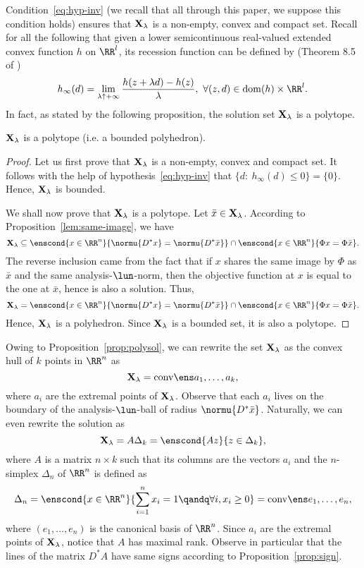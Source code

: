 Condition~\cref{eq:hyp-inv} (we recall that all through this paper, we suppose this condition holds) ensures that $\mathbf{X}_{\lambda}$ is a non-empty, convex and compact set.
 Recall for all the following that given a lower semicontinuous real-valued extended convex function $h$ on $\RR^l$, its recession function can be defined by (Theorem 8.5 of \cite{rockafellar})
$$h_\infty(d)=\lim\limits_{\lambda\uparrow+\infty}\displaystyle{h(z+\lambda d)-h(z)\over\lambda},\ \forall (z,d)\in \dom(h)\times\RR^{l}.$$
In fact, as stated by the following proposition, the solution set $\mathbf{X}_{\lambda}$ is a polytope.
\begin{proposition}\label{prop:polysol}
  $\mathbf{X}_{\lambda}$ is a polytope (i.e. a bounded polyhedron).
\end{proposition}
\begin{proof}
  Let us first prove that $\mathbf{X}_{\lambda}$ is a non-empty, convex and compact set. 
It follows with the help of hypothesis~\eqref{eq:hyp-inv} that $\{d:\ h_\infty(d)\leq0\}=\{0\}$.
  Hence, $\mathbf{X}_{\lambda}$ is bounded.

  We shall now prove that $\mathbf{X}_{\lambda}$ is a polytope.
  Let $\bar{x} \in \mathbf{X}_{\lambda}$.
  According to Proposition~\ref{lem:same-image}, we have
  \begin{equation*}
    \Xl \subseteq
    \enscond{x \in \RR^n}{\normu{D^* x} = \normu{D^* \bar{x}}} \cap
    \enscond{x \in \RR^n}{\Phi x = \Phi \bar{x}} .
  \end{equation*}
  The reverse inclusion came from the fact that if $x$ shares the same image by $\Phi$ as $\bar{x}$ and the same analysis-$\lun$-norm, then the objective function at $x$ is equal to the one at $\bar{x}$, hence is also a solution.
  Thus,
  \begin{equation*}
    \Xl =
    \enscond{x \in \RR^n}{\normu{D^* x} = \normu{D^* \bar{x}}} \cap
    \enscond{x \in \RR^n}{\Phi x = \Phi \bar{x}} .
  \end{equation*}
  Hence, $\mathbf{X}_{\lambda}$ is a polyhedron. Since $\mathbf{X}_{\lambda}$ is a bounded set, it is also a polytope.
\end{proof}

Owing to Proposition~\ref{prop:polysol}, we can rewrite the set $\mathbf{X}_{\lambda}$ as the convex hull of $k$ points in $\RR^n$ as
\begin{equation*}
  \Xl = \conv{a_1, \dots, a_k} ,
\end{equation*}
where $a_i$ are the extremal points of $\mathbf{X}_{\lambda}$.
Observe that each $a_i$ lives on the boundary of the analysis-$\lun$-ball of radius $\normu{D^* \bar{x}}$.
Naturally, we can even rewrite the solution as
\begin{equation*}
  \Xl = A \Delta_k = \enscond{A z}{z \in \Delta_k} ,
\end{equation*}
where $A$ is a matrix $n \times k$ such that its columns are the vectors
$a_i$ and the $n$-simplex $\Delta_n$ of $\RR^n$ is defined as
\begin{equation*}
  \Delta_n = \enscond{x \in \RR^n}{\sum_{i=1}^n x_i = 1 \qandq \forall i, x_i \geq 0} = \conv{e_1,\dots,e_n} ,
\end{equation*}
where $(e_1,\dots,e_n)$ is the canonical basis of $\RR^n$.
Since $a_i$ are the extremal points of $\mathbf{X}_{\lambda}$, notice that $A$ has maximal rank.
Observe in particular that the lines of the matrix $D^* A$ have same signs according to Proposition~\ref{prop:sign}.